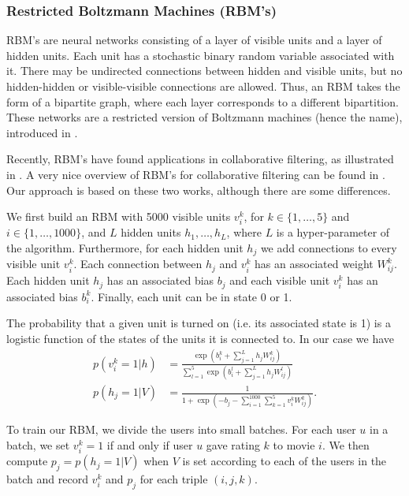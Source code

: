 \documentclass[10pt,conference,compsocconf]{IEEEtran}
\begin{document}
	\subsubsection*{\textbf{Restricted Boltzmann Machines (RBM's)}}
	
	RBM's are neural networks consisting of a layer of visible units and a layer of hidden units. Each unit has a stochastic binary random variable associated with it. There may be undirected connections between hidden and visible units, but no hidden-hidden or visible-visible connections are allowed. Thus, an RBM takes the form of a bipartite graph, where each layer corresponds to a different bipartition. These networks are a restricted version of Boltzmann machines (hence the name), introduced in \cite{AHS85}.
	
	Recently, RBM's have found applications in collaborative filtering, as illustrated in \cite{SMH07}. A very nice overview of RBM's for collaborative filtering can be found in \cite{L10}. Our approach is based on these two works, although there are some differences.
	
	We first build an RBM with 5000 visible units $v^k_i$, for $k\in\{1,\dots,5\}$ and $i\in\{1,\dots,1000\}$, and $L$ hidden units $h_1,\dots, h_L$, where $L$ is a hyper-parameter of the algorithm. Furthermore, for each hidden unit $h_j$ we add connections to every visible unit $v^k_i$. Each connection between $h_j$ and $v^k_i$ has an associated weight $W^k_{ij}$. Each hidden unit $h_j$ has an associated bias $b_j$ and each visible unit $v^k_i$ has an associated bias $b^k_i$. Finally, each unit can be in state 0 or 1.
	
	The probability that a given unit is turned on (i.e. its associated state is 1) is a logistic function of the states of the units it is connected to. In our case we have
	\begin{equation}
	\begin{split}
	p(v^k_i=1|h)&=\frac{\exp(b^k_i+\sum_{j=1}^L h_jW^k_{ij})}{\sum_{l=1}^{5}\exp(b^l_i+\sum_{j=1}^{L}h_jW^l_{ij})}\\
	p(h_j=1|V)&=\frac{1}{1+\exp(-b_j-\sum_{i=1}^{1000}\sum_{k=1}^{5}v^k_iW^k_{ij})}.
	\end{split}
	\end{equation}
	
	To train our RBM, we divide the users into small batches. For each user $u$ in a batch, we set $v^k_i=1$ if and only if user $u$ gave rating $k$ to movie $i$. We then compute $p_j=p(h_j=1|V)$ when $V$ is set according to each of the users in the batch and record $v^k_i$ and $p_j$ for each triple $(i,j,k)$.
	
\end{document}
